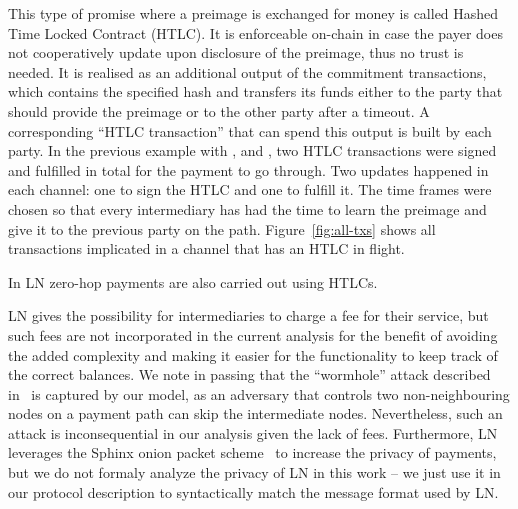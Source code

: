    This type of promise where a preimage is exchanged for money is called
    Hashed Time Locked Contract (HTLC). It is enforceable on-chain in case the
    payer does not cooperatively update upon disclosure of the preimage, thus no
    trust is needed. It is realised as an additional output of the commitment
    transactions, which contains the specified hash and transfers its funds
    either to the party that should provide the preimage or to the other party
    after a timeout. A corresponding ``HTLC transaction'' that can spend this
    output is built by each party. In the previous example with \alice{}, \bob{}
    and \charlie, two HTLC transactions were signed and fulfilled in total for
    the payment to go through. Two updates happened in each channel: one to sign
    the HTLC and one to fulfill it. The time frames were chosen so that every
    intermediary has had the time to learn the preimage and give it to the
    previous party on the path. Figure~\ref{fig:all-txs} shows all transactions
    implicated in a channel that has an HTLC in flight.

    In LN zero-hop payments are also carried out using HTLCs.

    LN gives the possibility for intermediaries to charge a fee for their
    service, but such fees are not incorporated in the current analysis for the
    benefit of avoiding the added complexity and making it easier for the
    functionality to keep track of the correct balances. We note in passing that the
    ``wormhole'' attack described in~\cite{DBLP:conf/ndss/MalavoltaMSKM19} is
    captured by our model, as an adversary that controls two non-neighbouring
    nodes on a payment path can skip the intermediate nodes. Nevertheless, such
    an attack is inconsequential in our analysis given the lack of fees.
    Furthermore, LN leverages the Sphinx onion packet scheme~\cite{sphinx} to
    increase the privacy of payments, but we do not formaly analyze the privacy
    of LN in this work -- we just use it in our protocol description to
    syntactically match the message format used by LN.
